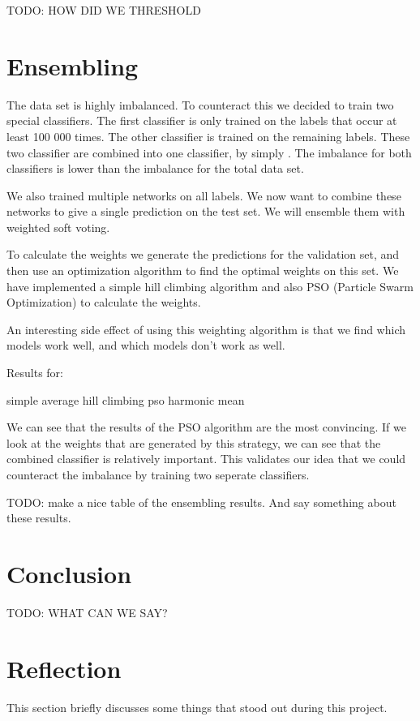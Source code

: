 \documentclass[10pt, a4paper]{article}
\begin{document}
\begin{multicols}{2}
		TODO: HOW DID WE THRESHOLD
		
		\section{Ensembling}
		
		The data set is highly imbalanced. To counteract this we decided to train two special classifiers. The first classifier is only trained on the labels that occur at least 100 000 times. The other classifier is trained on the remaining labels. These two classifier are combined into one classifier, by simply . The imbalance for both classifiers is lower than the imbalance for the total data set. 

        We also trained multiple networks on all labels. We now want to combine these networks to give a single prediction on the test set. We will ensemble them with weighted soft voting. 

        To calculate the weights we generate the predictions for the validation set, and then use an optimization algorithm to find the optimal weights on this set. We have implemented a simple hill climbing algorithm and also PSO (Particle Swarm Optimization) to calculate the weights. 

        An interesting side effect of using this weighting algorithm is that we find which models work well, and which models don't work as well. 

        Results for:

        simple average
        hill climbing
        pso
        harmonic mean

        We can see that the results of the PSO algorithm are the most convincing. If we look at the weights that are generated by this strategy, we can see that the combined classifier is relatively important. This validates our idea that we could counteract the imbalance by training two seperate classifiers.


        TODO: make a nice table of the ensembling results. And say something about these results.
		
		\section{Conclusion}
		
		TODO: WHAT CAN WE SAY?
	
		\section{Reflection}
		This section briefly discusses some things that stood out during this project.
	    
	
	
	\end{multicols}
	
\end{document}
